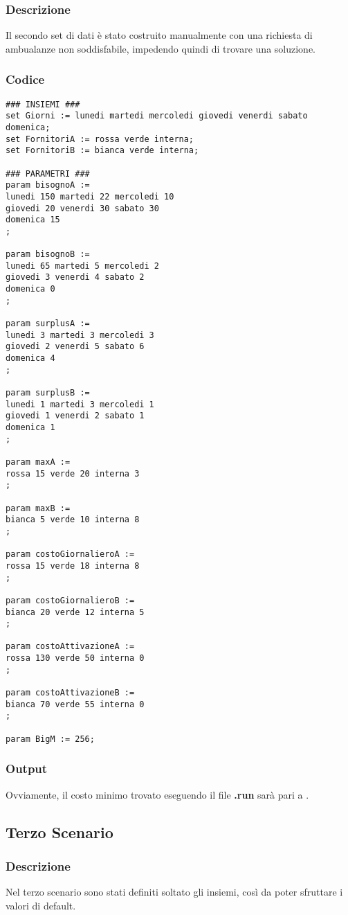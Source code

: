 \subsubsection{Descrizione}
Il secondo set di dati è stato costruito manualmente con una richiesta di ambualanze non soddisfabile, impedendo quindi di trovare una soluzione.
\subsubsection{Codice}
\begin{lstlisting}
### INSIEMI ###
set Giorni := lunedi martedi mercoledi giovedi venerdi sabato domenica;
set FornitoriA := rossa verde interna;
set FornitoriB := bianca verde interna;

### PARAMETRI ###
param bisognoA := 
lunedi 150 martedi 22 mercoledi 10 
giovedi 20 venerdi 30 sabato 30
domenica 15
;

param bisognoB := 
lunedi 65 martedi 5 mercoledi 2
giovedi 3 venerdi 4 sabato 2
domenica 0
;

param surplusA :=
lunedi 3 martedi 3 mercoledi 3
giovedi 2 venerdi 5 sabato 6
domenica 4
;

param surplusB :=
lunedi 1 martedi 3 mercoledi 1
giovedi 1 venerdi 2 sabato 1
domenica 1
;

param maxA :=
rossa 15 verde 20 interna 3
;

param maxB :=
bianca 5 verde 10 interna 8
;

param costoGiornalieroA :=
rossa 15 verde 18 interna 8
;

param costoGiornalieroB :=
bianca 20 verde 12 interna 5
;

param costoAttivazioneA :=
rossa 130 verde 50 interna 0
;

param costoAttivazioneB :=
bianca 70 verde 55 interna 0
; 

param BigM := 256;
\end{lstlisting}
\subsubsection{Output}
Ovviamente, il costo minimo trovato eseguendo il file \textbf{.run} sarà pari a .

\subsection{Terzo Scenario}
\subsubsection{Descrizione}
Nel terzo scenario sono stati definiti soltato gli insiemi, così da poter sfruttare i valori di default.
